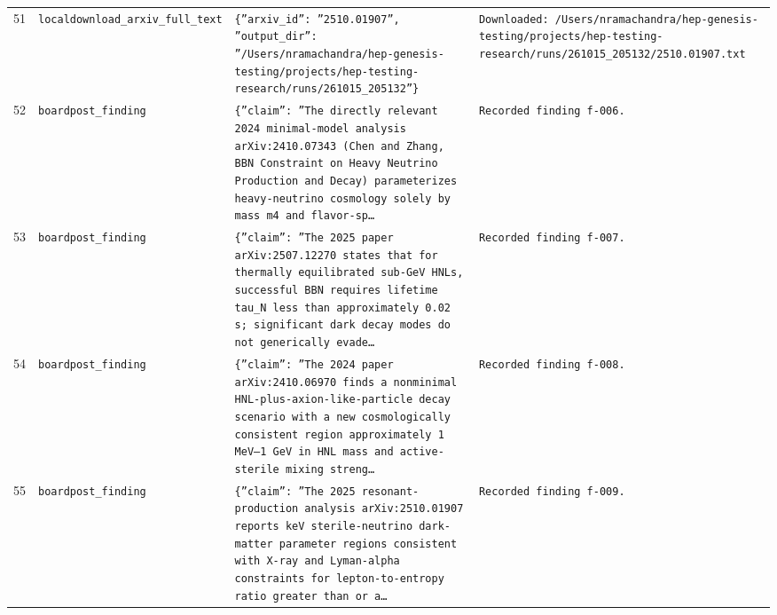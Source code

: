 \documentclass[11pt,a4paper]{article}
\begin{document}
\begin{longtable}{@{}p{}p{}p{}p{}@{}}
51 & \texttt{local}\newline\texttt{download\_\allowbreak{}arxiv\_\allowbreak{}full\_\allowbreak{}text} & \texttt{\{''arxiv\_\allowbreak{}id'':\allowbreak{} ''2510.01907'',\allowbreak{} ''output\_\allowbreak{}dir'':\allowbreak{} ''/\allowbreak{}Users/\allowbreak{}nramachandra/\allowbreak{}hep-genesis-testing/\allowbreak{}projects/\allowbreak{}hep-testing-research/\allowbreak{}runs/\allowbreak{}261015\_\allowbreak{}205132''\}\allowbreak{}} & \texttt{Downloaded:\allowbreak{} /\allowbreak{}Users/\allowbreak{}nramachandra/\allowbreak{}hep-genesis-testing/\allowbreak{}projects/\allowbreak{}hep-testing-research/\allowbreak{}runs/\allowbreak{}261015\_\allowbreak{}205132/\allowbreak{}2510.01907.txt} \\
52 & \texttt{board}\newline\texttt{post\_\allowbreak{}finding} & \texttt{\{''claim'':\allowbreak{} ''The directly relevant 2024 minimal-model analysis arXiv:\allowbreak{}2410.07343 (Chen and Zhang,\allowbreak{} BBN Constraint on Heavy Neutrino Production and Decay)\allowbreak{} parameterizes heavy-neutrino cosmology solely by mass m4 and flavor-sp\ldots{}\allowbreak{}} & \texttt{Recorded finding f-006.} \\
53 & \texttt{board}\newline\texttt{post\_\allowbreak{}finding} & \texttt{\{''claim'':\allowbreak{} ''The 2025 paper arXiv:\allowbreak{}2507.12270 states that for thermally equilibrated sub-GeV HNLs,\allowbreak{} successful BBN requires lifetime tau\_\allowbreak{}N less than approximately 0.02 s;\allowbreak{} significant dark decay modes do not generically evade\ldots{}\allowbreak{}} & \texttt{Recorded finding f-007.} \\
54 & \texttt{board}\newline\texttt{post\_\allowbreak{}finding} & \texttt{\{''claim'':\allowbreak{} ''The 2024 paper arXiv:\allowbreak{}2410.06970 finds a nonminimal HNL-plus-axion-like-particle decay scenario with a new cosmologically consistent region approximately 1 MeV--1 GeV in HNL mass and active-sterile mixing streng\ldots{}\allowbreak{}} & \texttt{Recorded finding f-008.} \\
55 & \texttt{board}\newline\texttt{post\_\allowbreak{}finding} & \texttt{\{''claim'':\allowbreak{} ''The 2025 resonant-production analysis arXiv:\allowbreak{}2510.01907 reports keV sterile-neutrino dark-matter parameter regions consistent with X-ray and Lyman-alpha constraints for lepton-to-entropy ratio greater than or a\ldots{}\allowbreak{}} & \texttt{Recorded finding f-009.} \\

\end{longtable}
\end{document}
